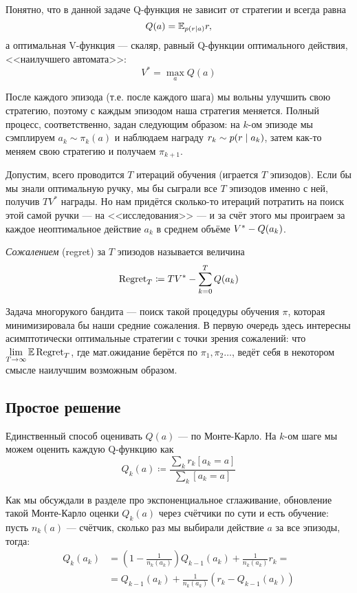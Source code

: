 Понятно, что в данной задаче Q-функция не зависит от стратегии и всегда равна
$$Q(a) = \mathbb{E}_{p(r \mid a)} r,$$
а оптимальная V-функция --- скаляр, равный Q-функции оптимального действия, <<наилучшего автомата>>:
$$V^* = \max\limits_a Q(a)$$

После каждого эпизода (т.е. после каждого шага) мы вольны улучшить свою стратегию, поэтому с каждым эпизодом наша стратегия меняется. Полный процесс, соответственно, задан следующим образом: на $k$-ом эпизоде мы сэмплируем $a_k \sim \pi_k(a)$ и наблюдаем награду $r_k \HM\sim p(r \HM\mid a_k)$, затем как-то меняем свою стратегию и получаем $\pi_{k+1}$. 

Допустим, всего проводится $T$ итераций обучения (играется $T$ эпизодов). Если бы мы знали оптимальную ручку, мы бы сыграли все $T$ эпизодов именно с ней, получив $TV^*$ награды. Но нам придётся сколько-то итераций потратить на поиск этой самой ручки --- на <<исследования>> --- и за счёт этого мы проиграем за каждое неоптимальное действие $a_k$ в среднем объёме $V^* \HM- Q(a_k)$.

\begin{definition}
\emph{Сожалением} (regret) за $T$ эпизодов называется величина
$$\operatorname{Regret}_T \coloneqq T V^* - \sum_{k=0}^T Q(a_k)$$
\end{definition}

Задача многорукого бандита --- поиск такой процедуры обучения $\pi$, которая минимизировала бы наши средние сожаления. В первую очередь здесь интересны асимптотически оптимальные стратегии с точки зрения сожалений: что $\lim\limits_{T \to \infty} \mathbb{E} \operatorname{Regret}_T$, где мат.ожидание берётся по $\pi_1, \pi_2 \dots$, ведёт себя в некотором смысле наилучшим возможным образом.

\subsection{Простое решение}

Единственный способ оценивать $Q(a)$ --- по Монте-Карло. На $k$-ом шаге мы можем оценить каждую Q-функцию как
$$Q_k(a) \coloneqq \frac{\sum_k r_k [a_k = a]}{\sum_k [a_k = a]}$$

Как мы обсуждали в разделе про экспоненциальное сглаживание, обновление такой Монте-Карло оценки $Q_k(a)$ через счётчики по сути и есть обучение: пусть $n_k(a)$ --- счётчик, сколько раз мы выбирали действие $a$ за все эпизоды, тогда:
\begin{align*}
Q_k(a_k) &= \left( 1 - \frac{1}{n_k(a_k)} \right)Q_{k-1}(a_k) + \frac{1}{n_k(a_k)} r_k = \\
&= Q_{k-1}(a_k) + \frac{1}{n_k(a_k)} \left( r_k - Q_{k-1}(a_k) \right)
\end{align*}

